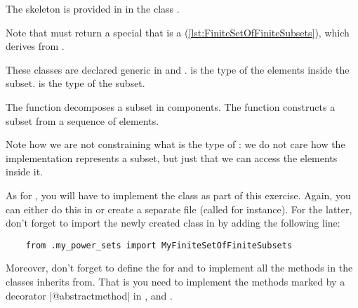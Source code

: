 \label{sec:power-set-exercise}


The skeleton is provided in  in the class .


Note that  must return a special  that is a  (\cref{lst:FiniteSetOfFiniteSubsets}), which derives from .


These classes are declared generic in  and .
 is the type of the elements inside the subset.
 is the type of the subset.

The function  decomposes a subset in components.
The function  constructs a subset from a sequence of elements.

Note how we are not constraining what is the type of : we do not care how the implementation represents a subset, but just that we can access the elements inside it.

As for \FiniteSet, you will have to implement the class  as part of this exercise.
Again, you can either do this in  or create a separate file (called  for instance).
For the latter, don't forget to import the newly created class in  by adding the following line:
\begin{verbatim}
    from .my_power_sets import MyFiniteSetOfFiniteSubsets
\end{verbatim}
Moreover, don't forget to define the  for  and to implement all the methods in the classes  inherits from.
That is you need to implement the methods marked by a decorator \pystr|@abstractmethod| in ,  and .

